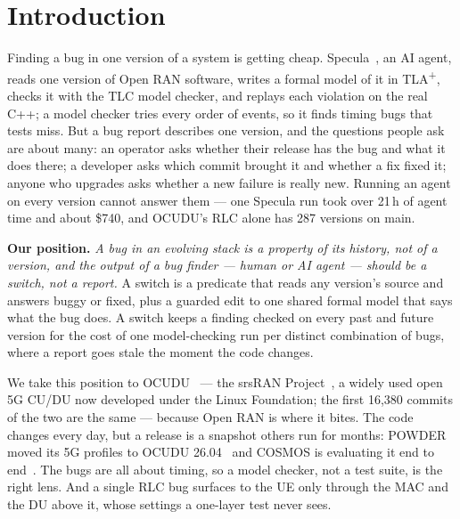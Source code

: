 \documentclass[sigconf,10pt]{acmart}
\begin{document}
\maketitle

\section{Introduction}

Finding a bug in one version of a system is getting cheap.
Specula~\cite{cheng2026specula}, an AI agent, reads one version of Open
RAN software, writes a formal model of it in TLA\textsuperscript{+},
checks it with the TLC model checker, and replays each violation on the
real C++; a model checker tries every order of events, so it finds
timing bugs that tests miss. But a bug report describes one version, and
the questions people ask are about many: an operator asks whether their
release has the bug and what it does there; a developer asks which commit
brought it and whether a fix fixed it; anyone who upgrades asks whether a
new failure is really new. Running an agent on every version cannot
answer them --- one Specula run took over 21\,h of agent time and about
\$740, and OCUDU's RLC alone has 287 versions on main.

\textbf{Our position.} \emph{A bug in an evolving stack is a property of
its history, not of a version, and the output of a bug finder --- human
or AI agent --- should be a switch, not a report.} A switch is a
predicate that reads any version's source and answers buggy or fixed,
plus a guarded edit to one shared formal model that says what the bug
does. A switch keeps a finding checked on every past and future version
for the cost of one model-checking run per distinct combination of bugs,
where a report goes stale the moment the code changes.

We take this position to OCUDU~\cite{ocudu} --- the srsRAN
Project~\cite{srsranproject}, a widely used open 5G CU/DU now developed
under the Linux Foundation; the first 16{,}380 commits of the two are the
same --- because Open RAN is where it bites. The code changes every day,
but a release is a snapshot others run for months: POWDER moved its 5G
profiles to OCUDU 26.04~\cite{powder2026ocudu} and COSMOS is evaluating
it end to end~\cite{cosmos2026ocudu}. The bugs are all about timing, so a
model checker, not a test suite, is the right lens. And a single RLC bug
surfaces to the UE only through the MAC and the DU above it, whose
settings a one-layer test never sees.
\end{document}
